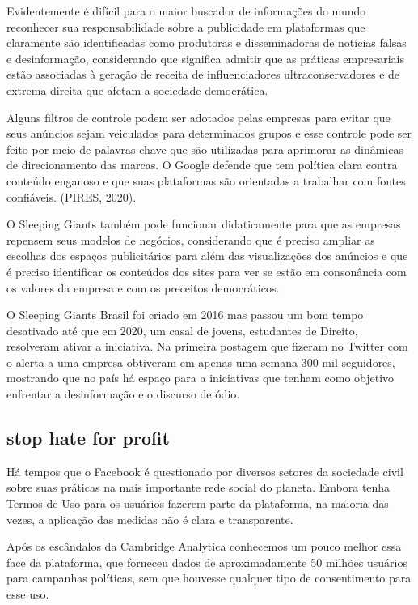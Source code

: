 Evidentemente é difícil para o maior buscador de informações do mundo
reconhecer sua responsabilidade sobre a publicidade em plataformas que
claramente são identificadas como produtoras e disseminadoras de
notícias falsas e desinformação, considerando que significa admitir que
as práticas empresariais estão associadas à geração de receita de
influenciadores ultraconservadores e de extrema direita que afetam a
sociedade democrática.

Alguns filtros de controle podem ser adotados pelas empresas para evitar
que seus anúncios sejam veiculados para determinados grupos e esse
controle pode ser feito por meio de palavras-chave que são utilizadas
para aprimorar as dinâmicas de direcionamento das marcas. O Google
defende que tem política clara contra conteúdo enganoso e que suas
plataformas são orientadas a trabalhar com fontes confiáveis. (PIRES,
2020).

O Sleeping Giants também pode funcionar didaticamente para que as
empresas repensem seus modelos de negócios, considerando que é preciso
ampliar as escolhas dos espaços publicitários para além das
visualizações dos anúncios e que é preciso identificar os conteúdos dos
sites para ver se estão em consonância com os valores da empresa e com
os preceitos democráticos.

O Sleeping Giants Brasil foi criado em 2016 mas passou um bom tempo
desativado até que em 2020, um casal de jovens, estudantes de Direito,
resolveram ativar a iniciativa. Na primeira postagem que fizeram no
Twitter com o alerta a uma empresa obtiveram em apenas uma semana 300
mil seguidores, mostrando que no país há espaço para a iniciativas que
tenham como objetivo enfrentar a desinformação e o discurso de ódio.

\subsection{stop hate for profit}

Há tempos que o Facebook é questionado por diversos setores da sociedade
civil sobre suas práticas na mais importante rede social do planeta.
Embora tenha Termos de Uso para os usuários fazerem parte da plataforma,
na maioria das vezes, a aplicação das medidas não é clara e
transparente.

Após os escândalos da Cambridge Analytica conhecemos um pouco melhor
essa face da plataforma, que forneceu dados de aproximadamente 50
milhões usuários para campanhas políticas, sem que houvesse qualquer
tipo de consentimento para esse uso.

